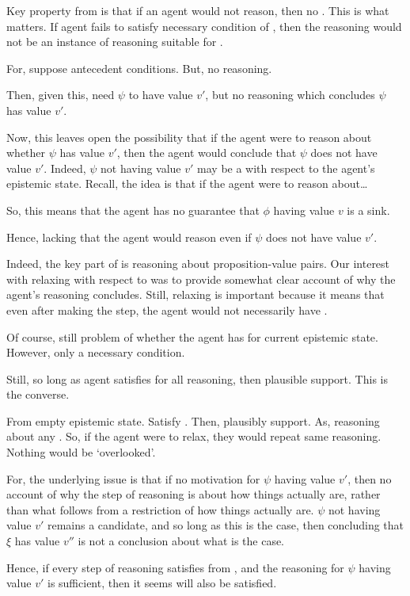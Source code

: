 \begin{note}
  Key property from \ideaS{} is that if an agent would not reason, then no \support{}.
  This is what matters.
  If agent fails to satisfy necessary condition of \ideaCS{}, then the reasoning would not be an instance of reasoning suitable for \support{}.

  For, suppose antecedent conditions.
  But, no reasoning.

  Then, given this, need \(\psi\) to have value \(v'\), but no reasoning which concludes \(\psi\) has value \(v'\).

  Now, this leaves open the possibility that if the agent were to reason about whether \(\psi\) has value \(v'\), then the agent would conclude that \(\psi\) does not have value \(v'\).
  Indeed, \(\psi\) not having value \(v'\) may be a \sink{} with respect to the agent's epistemic state.
  Recall, the idea is that if the agent were to reason about\dots

  So, this means that the agent has no guarantee that \(\phi\) having value \(v\) is a sink.

  Hence, lacking that the agent would reason even if \(\psi\) does not have value \(v'\).

  Indeed, the key part of \ideaS{} is reasoning about \epVAd{} proposition-value pairs.
  Our interest with relaxing with respect to \ideaS{} was to provide somewhat clear account of why the agent's reasoning concludes.
  Still, relaxing is important because it means that even after making the step, the agent would not necessarily have \support{}.

  Of course, still problem of whether the agent has \support{} for current epistemic state.
  However, only a necessary condition.

  Still, so long as agent satisfies \ideaCS{} for all reasoning, then plausible support.
  This is the converse.
\end{note}

\begin{note}
  From empty epistemic state.
  Satisfy \ideaCS{}.
  Then, plausibly support.
  As, reasoning about any \requ{}.
  So, if the agent were to relax, they would repeat same reasoning.
  Nothing would be `overlooked'.
\end{note}

\begin{note}
  \color{red}
  For, the underlying issue is that if no motivation for \(\psi\) having value \(v'\), then no account of why the step of reasoning is about how things actually are, rather than what follows from a restriction of how things actually are.
  \(\psi\) not having value \(v'\) remains a candidate, and so long as this is the case, then concluding that \(\xi\) has value \(v''\) is not a conclusion about what is the case.

  Hence, if every step of reasoning satisfies \ideaCS{} from \epPAd{} \world{}, and the reasoning for \(\psi\) having value \(v'\) is sufficient, then it seems \ideaS{} will also be satisfied.
\end{note}

